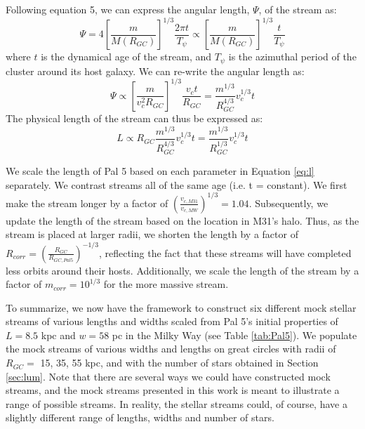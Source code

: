 \documentclass[twocolumn]{aastex62}
\newcommand{\todo}[1]{{\color{red} TODO: #1}}
\begin{document}
Following \citet{johnston01} equation 5, we can express the angular length, $\Psi$, of the stream as:
\begin{equation}
\Psi = 4  \left[\frac{m}{M(R_{GC})}\right]^{1/3}  \frac{2 \pi t}{T_{\psi}} \propto \left[\frac{m}{M(R_{GC})}\right]^{1/3}  \frac{t}{T_{\psi}}
\end{equation}
where $t$ is the dynamical age of the stream, and $T_{\psi}$ is the azimuthal period of the cluster around its host galaxy. We can re-write the angular length as:
\begin{equation}
\Psi \propto \left[\frac{m }{v_c^2 R_{GC}}\right]^{1/3}  \frac{v_c t }{R_{GC}} = \frac{m^{1/3}}{R_{GC}^{4/3}} v_c^{1/3}t
\end{equation}
The physical length of the stream can thus be expressed as:
\begin{equation}
\label{eq:l}
L \propto R_{GC} \frac{m^{1/3}}{R_{GC}^{4/3}} v_c^{1/3}t = \frac{m^{1/3}}{R_{GC}^{1/3}} v_c^{1/3}t
\end{equation}

We scale  the length of Pal 5 based on each parameter in Equation \ref{eq:l} separately. We contrast streams all of the same age (i.e.  t = constant). We first make the stream longer by a factor of $(\frac{v_{c,M31}}{v_{c,MW}})^{1/3} = 1.04$. Subsequently, we update the length of the stream based on the location in M31's halo. Thus, as the stream is placed at larger radii, we shorten the length by a factor of  $R_{corr} = \left(\frac{R_{GC}}{R_{GC,Pal5}}\right)^{-1/3}$, reflecting the fact that these streams will have completed less orbits around their hosts. %
Additionally, we scale the length of the stream by a factor of $m_{corr} = 10^{1/3}$ for the more massive stream. 

To summarize, we now have the framework to construct six different mock stellar streams of various lengths and widths scaled from Pal 5's initial properties of $L = 8.5$ kpc and $w = 58$ pc in the Milky Way (see Table \ref{tab:Pal5}). We populate the mock streams of various widths and lengths on great circles with radii of $R_{GC} =$ 15, 35, 55 kpc, and with the number of stars obtained in Section \ref{sec:lum}. Note that there are several ways we could have constructed mock streams, and the mock streams presented in this work is meant to illustrate a range of possible streams. In reality, the stellar streams could, of course, have a slightly different range of lengths, widths and number of stars.
\end{document}
